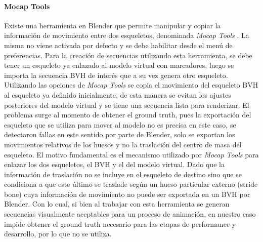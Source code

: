 \paragraph{Mocap Tools}

Existe una herramienta en Blender que permite manipular y copiar la información de movimiento entre dos esqueletos, denominada \textit{Mocap Tools} . La misma no viene activada por defecto y se debe habilitar desde el menú de preferencias. Para la creación de secuencias utilizando esta herramienta, se debe tener un esqueleto ya enlazado al modelo virtual con marcadores, luego se importa la secuencia BVH de interés que a su vez genera otro esqueleto. Utilizando las opciones de \textit{Mocap Tools}  se copia el movimiento del esqueleto BVH al esqueleto ya definido inicialmente, de esta manera se evitan los ajustes posteriores del modelo virtual y se tiene una secuencia lista para renderizar. 
El problema surge al momento de obtener el ground truth, pues la exportación del esqueleto que se utiliza para mover al modelo no es precisa en este caso, se detectaron fallas en este sentido por parte de Blender, solo se exportan los movimientos relativos de los huesos y no la traslación del centro de masa del esqueleto. El motivo fundamental es el mecanismo utilizado por \textit{Mocap Tools} para enlazar los dos esqueletos, el BVH y el del modelo virtual. Dado que la información de traslación no se incluye en el esqueleto de destino sino que se condiciona a que este último se traslade según un hueso particular externo (\textsf{stride bone})  cuya información de movimiento no puede ser exportada en un BVH por Blender. Con lo cual, si bien al trabajar con esta herramienta se generan secuencias visualmente aceptables para un proceso de animación, en nuestro caso impide obtener el ground truth necesario para las etapas de performance y desarrollo, por lo que no se utiliza.
 
    






